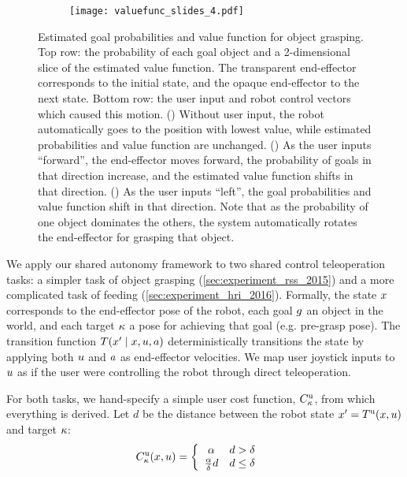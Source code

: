 \begin{figure*}[t]
\begin{subfigure}{0.32\textwidth}
\begin{tikzpicture}[every node/.style={anchor=south west,inner sep=0pt}, x=1mm, y=1mm,]
 \end{tikzpicture}
  \texttt{[image: valuefunc\_slides\_4.pdf]}
 \caption{ }
 \label{fig:valfunc_4}
 \end{subfigure}
  \label{fig:valfunc}
  \caption{Estimated goal probabilities and value function for object grasping. Top row: the probability of each goal object and a 2-dimensional slice of the estimated value function. The transparent end-effector corresponds to the initial state, and the opaque end-effector to the next state. Bottom row: the user input and robot control vectors which caused this motion. () Without user input, the robot automatically goes to the position with lowest value, while estimated probabilities and value function are unchanged. () As the user inputs ``forward'', the end-effector moves forward, the probability of goals in that direction increase, and the estimated value function shifts in that direction. () As the user inputs ``left'', the goal probabilities and value function shift in that direction. Note that as the probability of one object dominates the others, the system automatically rotates the end-effector for grasping that object.}
\end{figure*}


We apply our shared autonomy framework to two shared control teleoperation tasks: a simpler task of object grasping (\cref{sec:experiment_rss_2015}) and a more complicated task of feeding (\cref{sec:experiment_hri_2016}). Formally, the state $\stateenv$ corresponds to the end-effector pose of the robot, each goal $\goal$ an object in the world, and each target $\target$ a pose for achieving that goal (e.g. pre-grasp pose). The transition function $\transitionallargs$ deterministically transitions the state by applying both $\actionuser$ and $\actionrobot$ as end-effector velocities. We map user joystick inputs to $\actionuser$ as if the user were controlling the robot through direct teleoperation.

For both tasks, we hand-specify a simple user cost function, $\costtarguser$, from which everything is derived. Let $d$ be the distance between the robot state $\stateenv' = \transitionuser(\stateenv, \actionuser)$ and target $\target$:
 \begin{align*}
   \costtarguser(\stateenv, \actionuser) &= \left\{ \begin{array}{cc} \alpha & d > \delta \\ \frac{\alpha}{\delta} d & d\leq \delta \end{array} \right.
 \end{align*}

